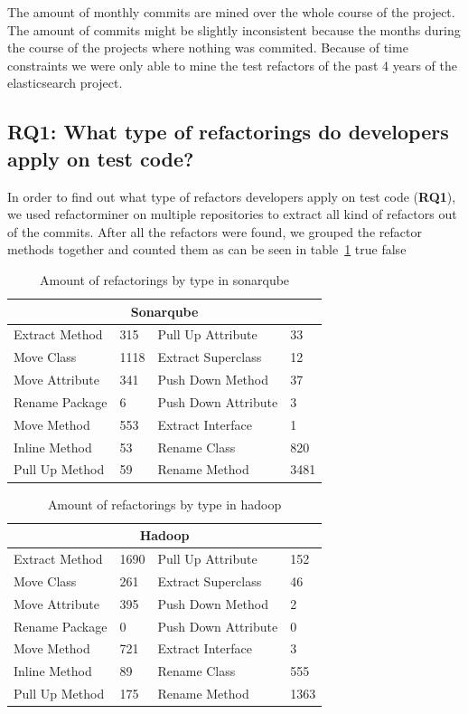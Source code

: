 The amount of monthly commits are mined over the whole course of the project. The amount of commits might be slightly inconsistent because the months during the course of the projects where nothing was commited. Because of time constraints we were only able to mine the test refactors of the past 4 years of the elasticsearch project.

\subsection{RQ1: What type of refactorings do developers apply on test code?}
\label{refactormethods}
In order to find out what type of refactors developers apply on test code (\textbf{RQ1}), we used refactorminer on multiple repositories to extract all kind of refactors out of the commits. After all the refactors were found, we grouped the refactor methods together and counted them as can be seen in table~\ref{table:9}
\ifx true false

\begin{table}[h!]
\centering
\begin{tabular}{|l|l|l|l|}
\hline
\multicolumn{4}{|c|}{Sonarqube} \\ \hline
Extract Method & 315 & Pull Up Attribute & 33 \\ \hline
Move Class & 1118 & Extract Superclass & 12 \\ \hline
Move Attribute & 341 & Push Down Method & 37 \\ \hline
Rename Package & 6 &  Push Down Attribute & 3 \\ \hline
Move Method & 553 & Extract Interface & 1 \\ \hline
Inline Method & 53 & Rename Class & 820 \\ \hline
Pull Up Method & 59 & Rename Method & 3481 \\ \hline
\end{tabular}
\caption{Amount of refactorings by type in sonarqube}
\label{table:9}
\end{table}

\begin{table}[h!]
\centering
\begin{tabular}{|l|l|l|l|}
\hline
\multicolumn{4}{|c|}{Hadoop} \\ \hline
Extract Method & 1690 & Pull Up Attribute & 152 \\ \hline
Move Class & 261 & Extract Superclass & 46 \\ \hline
Move Attribute & 395 & Push Down Method & 2 \\ \hline
Rename Package & 0 &  Push Down Attribute & 0 \\ \hline
Move Method & 721 & Extract Interface & 3 \\ \hline
Inline Method & 89 & Rename Class & 555 \\ \hline
Pull Up Method & 175 & Rename Method & 1363 \\ \hline
\end{tabular}
\caption{Amount of refactorings by type in hadoop}
\label{table:10}
\end{table}

